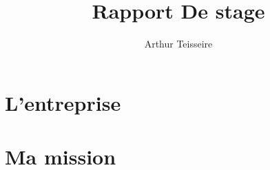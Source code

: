 \documentclass[a4paper]{report}
\title{Rapport De stage}
\author{Arthur Teisseire}
\begin{document}
	

	\tableofcontents
	
	\part{L'entreprise}
		
		
	\part{Ma mission}
\end{document}
